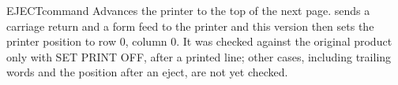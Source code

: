 \begin{XbaseEntry}{EJECT}{command}
Advances the printer to the top of the next page.
\Syntax
{}
\Usage
{} sends a carriage return and a form feed to the printer and this
version then sets the printer position to row 0, column 0.  It was checked
against the original product only with SET PRINT OFF, after a printed line; other
cases, including trailing words and the position after an eject, are not yet
checked.
\end{XbaseEntry}
